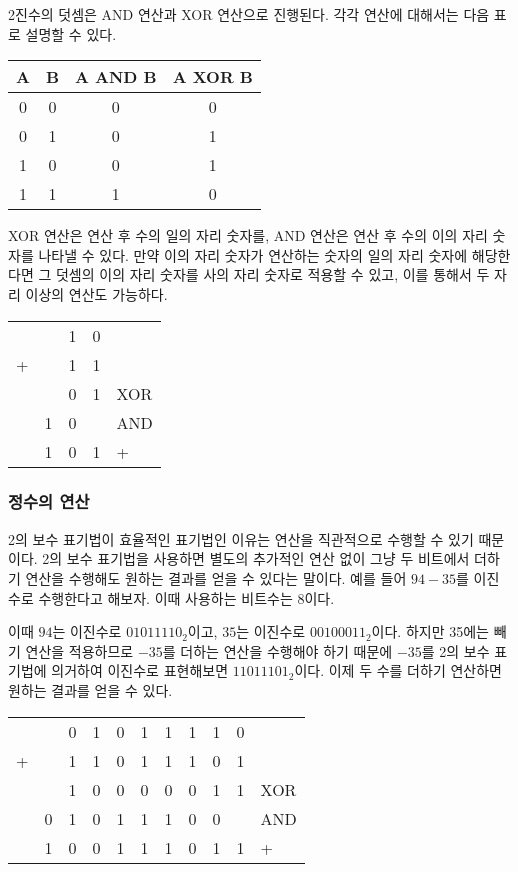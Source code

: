 \documentclass{article}
\begin{document}
2진수의 덧셈은 AND 연산과 XOR 연산으로 진행된다. 각각 연산에 대해서는 다음 표로 설명할
수 있다.

\begin{center}
    \begin{tabular}{cc|cc}
        A & B & A AND B & A XOR B \\
        \hline
        0 & 0 & 0 & 0 \\
        0 & 1 & 0 & 1 \\
        1 & 0 & 0 & 1 \\
        1 & 1 & 1 & 0
    \end{tabular}
\end{center}

XOR 연산은 연산 후 수의 일의 자리 숫자를, AND 연산은 연산 후 수의 이의 자리 숫자를 나타낼 수
있다. 만약 이의 자리 숫자가 연산하는 숫자의 일의 자리 숫자에 해당한다면 그 덧셈의 이의 자리
숫자를 사의 자리 숫자로 적용할 수 있고, 이를 통해서 두 자리 이상의 연산도 가능하다.

\begin{center}
    \begin{tabular}{cccc|l}
          &   & 1 & 0 & \\
        + &   & 1 & 1 & \\
        \hline
          &   & 0 & 1 & XOR \\
          & 1 & 0 &   & AND \\
        \hline
          & 1 & 0 & 1 & +
    \end{tabular}
\end{center}

\subsubsection{정수의 연산}

2의 보수 표기법이 효율적인 표기법인 이유는 연산을 직관적으로 수행할 수 있기 때문이다.
2의 보수 표기법을 사용하면 별도의 추가적인 연산 없이 그냥 두 비트에서 더하기 연산을 수행해도
원하는 결과를 얻을 수 있다는 말이다. 예를 들어 $94 - 35$를 이진수로
수행한다고 해보자. 이때 사용하는 비트수는 8이다.

이때 $94$는 이진수로 $01011110_2$이고, $35$는 이진수로 $00100011_2$이다.
하지만 35에는 빼기 연산을 적용하므로 $-35$를 더하는 연산을 수행해야 하기 때문에
$-35$를 2의 보수 표기법에 의거하여 이진수로 표현해보면 $11011101_2$이다.
이제 두 수를 더하기 연산하면 원하는 결과를 얻을 수 있다.

\begin{center}
    \begin{tabular}{cc|cccccccc|l}
          &   & 0 & 1 & 0 & 1 & 1 & 1 & 1 & 0 & \\
        + &   & 1 & 1 & 0 & 1 & 1 & 1 & 0 & 1 & \\
        \hline
          &   & 1 & 0 & 0 & 0 & 0 & 0 & 1 & 1 & XOR \\
          & 0 & 1 & 0 & 1 & 1 & 1 & 0 & 0 &   & AND \\
        \hline
          & 1 & 0 & 0 & 1 & 1 & 1 & 0 & 1 & 1 & +
    \end{tabular}
\end{center}
\end{document}
